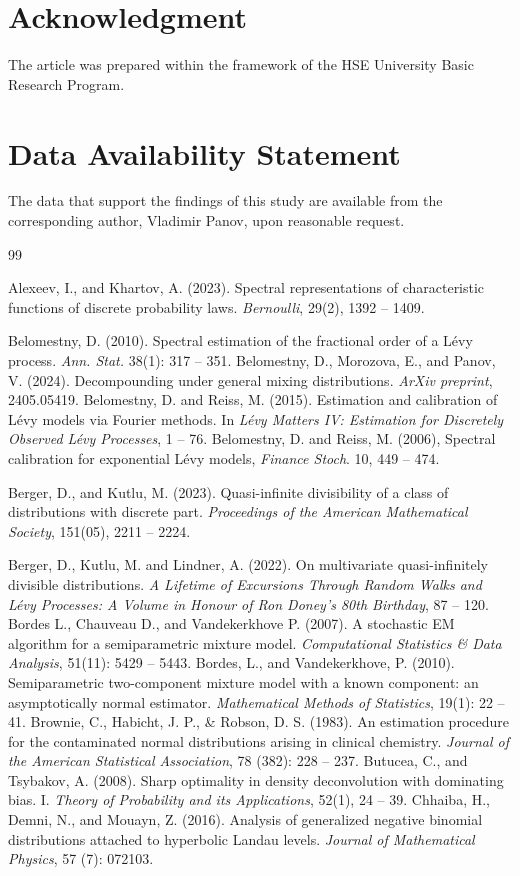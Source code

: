 \documentclass[a4paper,11pt]{article}
\theoremstyle{definition}
\newcommand{\1}{\mathbb{I}}
\theoremstyle{remark}
\begin{document}
\section*{Acknowledgment}
The article was prepared within the framework of the HSE University Basic Research Program.
\section*{Data Availability Statement}
The data that support the findings of this study are available from the corresponding author, Vladimir Panov, upon reasonable request.


\begin{thebibliography}{99}

Alexeev, I., and Khartov, A. (2023). Spectral representations of characteristic functions of discrete probability laws. \textit{Bernoulli}, 29(2), 1392 -- 1409.

 Belomestny, D. (2010). Spectral estimation of the fractional order of a L{\'e}vy process. \textit{Ann. Stat.} 38(1): 317 -- 351.
 Belomestny, D., Morozova, E., and Panov, V. (2024). Decompounding under general mixing distributions. \textit{ArXiv preprint}, 2405.05419.
Belomestny, D. and Reiss, M. (2015). Estimation and calibration of L{\'e}vy models via Fourier methods. In \textit{L{\'e}vy Matters IV: Estimation for Discretely Observed L{\'e}vy Processes}, 1 -- 76.
 Belomestny, D. and Reiss, M. (2006), Spectral calibration for exponential L{\'e}vy models, \textit{Finance Stoch}. 10, 449 -- 474.


Berger, D., and Kutlu, M. (2023). Quasi-infinite divisibility of a class of distributions with discrete part. \textit{Proceedings of the American Mathematical Society}, 151(05), 2211 -- 2224.

 Berger, D., Kutlu, M. and Lindner, A. (2022). On multivariate quasi-infinitely divisible distributions. \textit{A Lifetime of Excursions Through Random Walks and L{\'e}vy Processes: A Volume in Honour of Ron Doney's 80th Birthday}, 87 -- 120.
Bordes L., Chauveau D., and Vandekerkhove P. (2007). A stochastic EM algorithm for a semiparametric mixture model. \textit{Computational Statistics \& Data Analysis},
51(11): 5429 -- 5443.
 Bordes, L., and Vandekerkhove, P. (2010). Semiparametric two-component mixture model with a known component: an asymptotically normal estimator. \textit{Mathematical Methods of Statistics}, 19(1): 22 -- 41.
    Brownie, C., Habicht, J. P., \& Robson, D. S. (1983). An estimation procedure for the contaminated normal distributions arising in clinical chemistry. \textit{ Journal of the American Statistical Association}, 78 (382): 228 -- 237.
 Butucea, C., and Tsybakov, A. (2008). Sharp optimality in density deconvolution with dominating bias. I. \textit{Theory of Probability and its Applications}, 52(1), 24 -- 39.
 Chhaiba, H., Demni, N., and Mouayn, Z. (2016). Analysis of generalized negative binomial distributions attached to hyperbolic Landau levels. \textit{Journal of Mathematical
Physics}, 57 (7): 072103.


\end{thebibliography}
\end{document}
